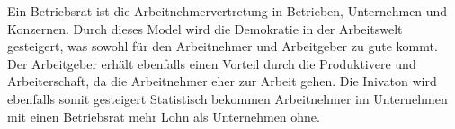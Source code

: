 Ein Betriebsrat ist die Arbeitnehmervertretung in Betrieben, Unternehmen und Konzernen.
Durch dieses Model wird die Demokratie in der Arbeitswelt gesteigert, was sowohl für den Arbeitnehmer und Arbeitgeber zu gute kommt.
\newline
Der Arbeitgeber erhält ebenfalls einen Vorteil durch die Produktivere und Arbeiterschaft, da die Arbeitnehmer eher zur Arbeit gehen. Die Inivaton wird ebenfalls somit gesteigert
\newline
Statistisch bekommen Arbeitnehmer im Unternehmen mit einen Betriebsrat mehr Lohn als Unternehmen ohne. 